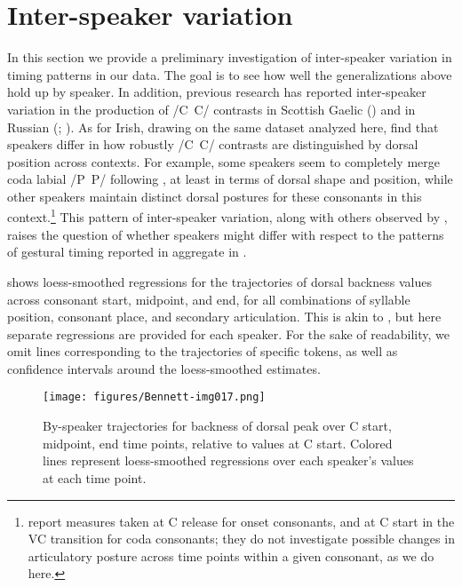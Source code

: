 \documentclass[output=paper,colorlinks,citecolor=brown]{langscibook}
\newcommand{\pal}{\ipa{ʲ}}
\newcommand{\vel}{\ipa{ˠ}}
\begin{document}
\section{Inter-speaker variation}\label{sec:individ-var}
In this section we provide a preliminary investigation of inter-speaker variation in timing patterns in our data. The goal is to see how well the generalizations above hold up by speaker. In addition, previous research has reported inter-speaker variation in the production of /C\vel\ C\pal/ contrasts in Scottish Gaelic (\citealt{Sung_etal:2018}) and in Russian (\cite{Kochetov2002_diss}; \citeyear{Kochetov2009_Russian_C_variation}). As for Irish, drawing on the same dataset analyzed here, \citet{Bennett_etal2023_jphon_submission} find that speakers differ in how robustly /C\vel\ C\pal/ contrasts are distinguished by dorsal position across contexts. For example, some speakers seem to completely merge coda labial /P\vel\ P\pal/ following , at least in terms of dorsal shape and position, while other speakers maintain distinct dorsal postures for these consonants in this context.\footnote{\citet{Bennett_etal2023_jphon_submission} report measures taken at C release for onset consonants, and at C start in the VC transition for coda consonants; they do not investigate possible changes in articulatory posture across time points within a given consonant, as we do here.} This pattern of inter-speaker variation, along with others observed by \citet{Bennett_etal2023_jphon_submission}, raises the question of whether speakers might differ with respect to the patterns of gestural timing reported in aggregate in .

 shows loess-smoothed regressions for the trajectories of dorsal backness values across consonant start, midpoint, and end, for all combinations of syllable position, consonant place, and secondary articulation. This is akin to , but here separate regressions are provided for each speaker. For the sake of readability, we omit lines corresponding to the trajectories of specific tokens, as well as confidence intervals around the loess-smoothed estimates.

\begin{figure}
    \centering
    \texttt{[image: figures/Bennett-img017.png]}
    \caption{By-speaker trajectories for backness of dorsal peak over C start, midpoint, end time points, relative to values at C start. Colored lines represent loess-smoothed regressions over each speaker's values at each time point.}
    \label{fig:trajectories-SPK}
\end{figure}
\end{document}

